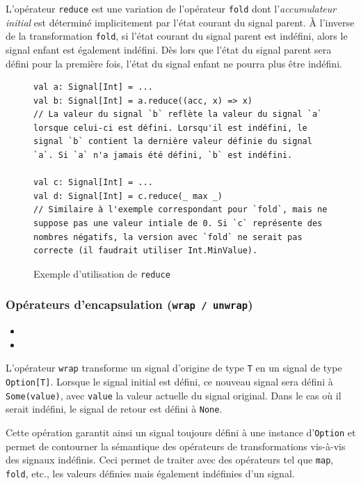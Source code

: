 L'opérateur \texttt{reduce} est une variation de l'opérateur \texttt{fold} dont l'\emph{accumulateur initial} est déterminé implicitement par l'état courant du signal parent. À l'inverse de la transformation \texttt{fold}, si l'état courant du signal parent est indéfini, alors le signal enfant est également indéfini. Dès lors que l'état du signal parent sera défini pour la première fois, l'état du signal enfant ne pourra plus être indéfini.

\begin{figure}[h]
	\begin{lstlisting}
val a: Signal[Int] = ...
val b: Signal[Int] = a.reduce((acc, x) => x)
// La valeur du signal `b` reflète la valeur du signal `a` lorsque celui-ci est défini. Lorsqu'il est indéfini, le signal `b` contient la dernière valeur définie du signal `a`. Si `a` n'a jamais été défini, `b` est indéfini.

val c: Signal[Int] = ...
val d: Signal[Int] = c.reduce(_ max _)
// Similaire à l'exemple correspondant pour `fold`, mais ne suppose pas une valeur intiale de 0. Si `c` représente des nombres négatifs, la version avec `fold` ne serait pas correcte (il faudrait utiliser Int.MinValue).
	\end{lstlisting}
	\caption{Exemple d'utilisation de \texttt{reduce}}
\end{figure}

\subsubsection{Opérateurs d'encapsulation (\texttt{wrap / unwrap})}

\begin{itemize}
	\item {}
	\item {}
\end{itemize}

L'opérateur \texttt{wrap} transforme un signal d'origine de type \texttt{T} en un signal de type \texttt{Option[T]}. Lorsque le signal initial est défini, ce nouveau signal sera défini à \texttt{Some(value)}, avec \texttt{value} la valeur actuelle du signal original. Dans le cas où il serait indéfini, le signal de retour est défini à \texttt{None}.

Cette opération garantit ainsi un signal toujours défini à une instance d'\texttt{Option} et permet de contourner la sémantique des opérateurs de transformations vis-à-vis des signaux indéfinis. Ceci permet de traiter avec des opérateurs tel que \texttt{map}, \texttt{fold}, etc., les valeurs définies mais également indéfinies d'un signal.

